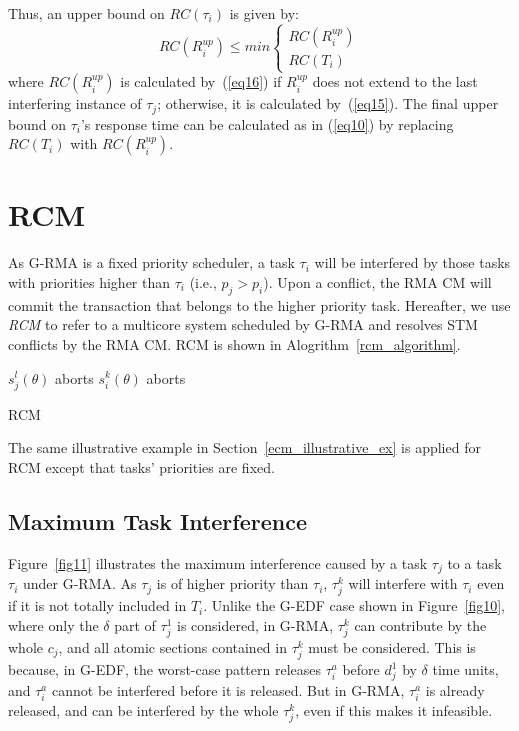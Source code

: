 \documentclass[12pt,english]{report}
\begin{document}
Thus, an upper bound on $RC(\tau_i)$ is given by:
\begin{equation}
RC(R_{i}^{up})\le min\begin{cases}
RC(R_{i}^{up})\\
RC(T_{i})\end{cases}
\label{eq17}
\end{equation}
where $RC(R_i^{up})$ is calculated by~(\ref{eq16}) if $R_i^{up}$ does not extend to the last interfering instance of $\tau_j$; otherwise, it is calculated by~(\ref{eq15}). The final upper bound on $\tau_{i}$'s response time can be calculated
as in (\ref{eq10}) by replacing $RC(T_{i})$ with
$RC(R_{i}^{up})$.



\section{RCM}
\label{sec:g-rma-rma-cm}

As G-RMA is a fixed priority scheduler,  a task $\tau_{i}$ will be interfered by those tasks with priorities higher than $\tau_{i}$ (i.e., $p_{j}>p_{i}$).  Upon a conflict, the RMA CM will commit the transaction that belongs to the higher priority task. Hereafter, we use \emph{RCM} to refer to a multicore system scheduled by G-RMA and resolves STM conflicts by the RMA CM. RCM is shown in Alogrithm~\ref{rcm_algorithm}.
\begin{algorithm}
\footnotesize{
\LinesNumbered
{}
	{$s_j^l(\theta)$ aborts\label{rcm:step_sicommits}\;}
	{$s_i^k(\theta)$ aborts\label{rcm:step_siaborts}\;}
	}
\caption{RCM}
\label{rcm_algorithm}
\end{algorithm}

The same illustrative example in Section~\ref{ecm_illustrative_ex} is applied for RCM except that tasks' priorities are fixed.

\subsection{Maximum Task Interference}

Figure~\ref{fig11} illustrates the maximum interference caused by a task $\tau_{j}$
to a task $\tau_{i}$ under G-RMA. As $\tau_{j}$ is of higher priority than $\tau_{i}$,
$\tau_{j}^{k}$ will interfere with $\tau_{i}$ even if it is not totally
included in $T_{i}$. Unlike the G-EDF case shown in Figure~\ref{fig10}, 
where only the $\delta$ part of $\tau_{j}^{1}$ is considered, in G-RMA,
$\tau_{j}^{k}$ can contribute by the whole $c_{j}$, and all atomic
sections contained in $\tau_{j}^{k}$ must be considered. This is because, in G-EDF, the worst-case pattern releases $\tau_{i}^a$ before $d_{j}^{1}$
by $\delta$ time units, and $\tau_{i}^a$ cannot be interfered before it
is released. But in G-RMA, $\tau_{i}^a$ is already released, and can be
interfered by the whole $\tau_{j}^{k}$, even if this makes it infeasible.
\end{document}
